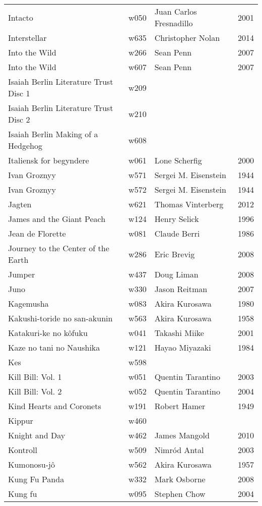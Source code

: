 \documentclass{article}
\begin{document}
\begin {center}
\begin{longtable}{p{10cm} l l l}
Intacto & w050 & Juan Carlos Fresnadillo & 2001 \\
Interstellar & w635 & Christopher Nolan & 2014 \\
Into the Wild & w266 & Sean Penn & 2007 \\
Into the Wild & w607 & Sean Penn & 2007 \\
Isaiah Berlin Literature Trust Disc 1 & w209 &  &  \\
Isaiah Berlin Literature Trust Disc 2 & w210 &  &  \\
Isaiah Berlin Making of a Hedgehog & w608 &  &  \\
Italiensk for begyndere & w061 & Lone Scherfig & 2000 \\
Ivan Groznyy & w571 & Sergei M. Eisenstein & 1944 \\
Ivan Groznyy & w572 & Sergei M. Eisenstein & 1944 \\
Jagten & w621 & Thomas Vinterberg & 2012 \\
James and the Giant Peach & w124 & Henry Selick & 1996 \\
Jean de Florette & w081 & Claude Berri & 1986 \\
Journey to the Center of the Earth & w286 & Eric Brevig & 2008 \\
Jumper & w437 & Doug Liman & 2008 \\
Juno & w330 & Jason Reitman & 2007 \\
Kagemusha & w083 & Akira Kurosawa & 1980 \\
Kakushi-toride no san-akunin & w563 & Akira Kurosawa & 1958 \\
Katakuri-ke no kôfuku & w041 & Takashi Miike & 2001 \\
Kaze no tani no Naushika & w121 & Hayao Miyazaki & 1984 \\
Kes & w598 &  &  \\
Kill Bill: Vol. 1 & w051 & Quentin Tarantino & 2003 \\
Kill Bill: Vol. 2 & w052 & Quentin Tarantino & 2004 \\
Kind Hearts and Coronets & w191 & Robert Hamer & 1949 \\
Kippur & w460 &  &  \\
Knight and Day & w462 & James Mangold & 2010 \\
Kontroll & w509 & Nimród Antal & 2003 \\
Kumonosu-jô & w562 & Akira Kurosawa & 1957 \\
Kung Fu Panda & w332 & Mark Osborne & 2008 \\
Kung fu & w095 & Stephen Chow & 2004 \\

\end{longtable}
\end{center}
\end{document}
